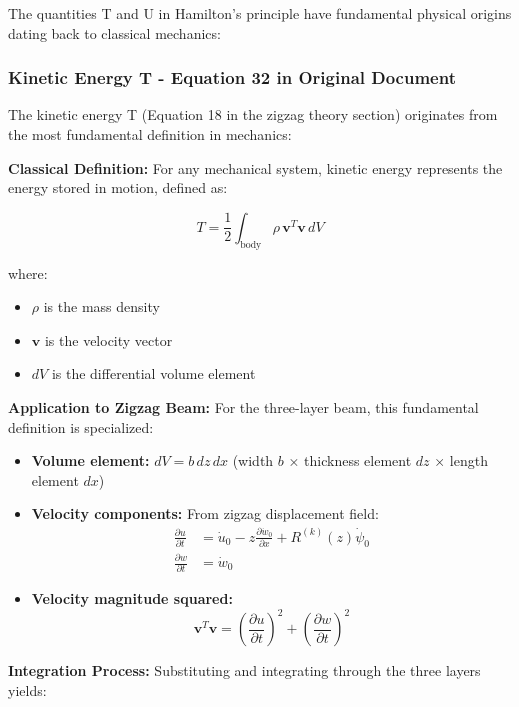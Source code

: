 \documentclass[12pt,a4paper]{article}
\begin{document}
The quantities T and U in Hamilton's principle have fundamental physical origins dating back to classical mechanics:

\subsubsection{Kinetic Energy T - Equation 32 in Original Document}

The kinetic energy T (Equation 18 in the zigzag theory section) originates from the most fundamental definition in mechanics:

\textbf{Classical Definition:} For any mechanical system, kinetic energy represents the energy stored in motion, defined as:

\begin{equation}
T = \frac{1}{2} \int_{\text{body}} \rho \, \mathbf{v}^T \mathbf{v} \, dV
\end{equation}

where:
\begin{itemize}
\item $\rho$ is the mass density
\item $\mathbf{v}$ is the velocity vector
\item $dV$ is the differential volume element
\end{itemize}

\textbf{Application to Zigzag Beam:} For the three-layer beam, this fundamental definition is specialized:

\begin{itemize}
\item \textbf{Volume element:} $dV = b \, dz \, dx$ (width $b$ × thickness element $dz$ × length element $dx$)
\item \textbf{Velocity components:} From zigzag displacement field:
    \begin{align}
    \frac{\partial u}{\partial t} &= \dot{u}_0 - z\frac{\partial \dot{w}_0}{\partial x} + R^{(k)}(z)\dot{\psi}_0 \\
    \frac{\partial w}{\partial t} &= \dot{w}_0
    \end{align}
\item \textbf{Velocity magnitude squared:}
    \begin{equation}
    \mathbf{v}^T\mathbf{v} = \left(\frac{\partial u}{\partial t}\right)^2 + \left(\frac{\partial w}{\partial t}\right)^2
    \end{equation}
\end{itemize}

\textbf{Integration Process:} Substituting and integrating through the three layers yields:
\end{document}
